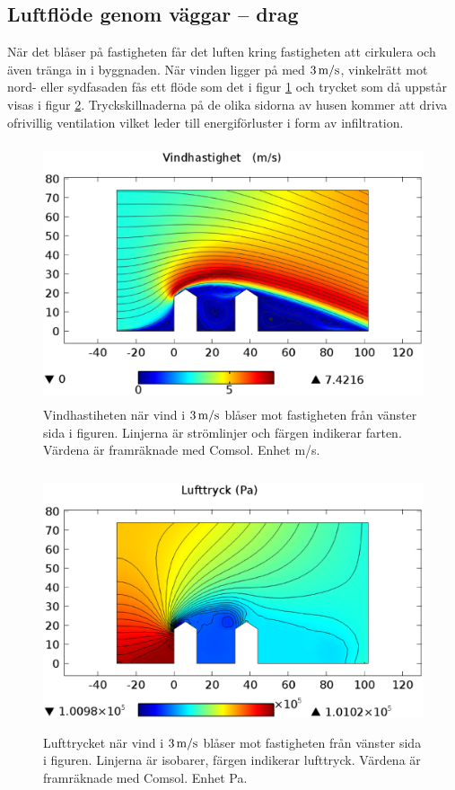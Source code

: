 \subsection{Luftflöde genom väggar – drag}

När det blåser på fastigheten får det luften kring fastigheten att cirkulera och även tränga in i 
byggnaden. När vinden ligger på med $\unit[3]{m/s}$, vinkelrätt mot nord- eller sydfasaden fås 
ett flöde som det i figur \ref{fig:windspeed} och trycket som då uppstår visas i figur 
\ref{fig:windpressure}. Tryckskillnaderna på de olika sidorna av husen kommer att driva 
ofrivillig ventilation vilket leder till energiförluster i form av infiltration.

\begin{figure}[hpbt]
\centering
\includegraphics[width=127mm,height=76mm]{images/wind3mshdpi.eps}
\caption{\label{fig:windspeed}Vindhastiheten när vind i $\unit[3]{m/s}$ blåser mot fastigheten 
från vänster sida i figuren. Linjerna är strömlinjer och färgen indikerar farten. Värdena är 
framräknade med Comsol. Enhet m/s.}
\end{figure}


\begin{figure}[hpbt]
\centering
\includegraphics[width=127mm,height=76mm]{images/pressure3mshdpi.eps}

\caption{\label{fig:windpressure}Lufttrycket när vind i $\unit[3]{m/s}$ blåser mot fastigheten från vänster sida i figuren. Linjerna är isobarer, färgen indikerar lufttryck. Värdena är framräknade med Comsol. Enhet Pa.}
\end{figure}

